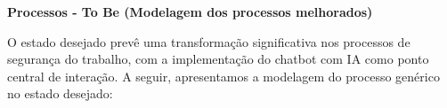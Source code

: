 \documentclass[12pt,a4paper]{article}
\begin{document}
\begin{table}[htbp]
\centering
\begin{minipage}{0.8\textwidth}
\centering
{}
\caption{Arquitetura tecnológica atual}
\end{minipage}
\end{table}

\begin{table}[htbp]
\centering
\begin{minipage}{0.8\textwidth}
\centering
{}
\caption{Arquitetura tecnológica nova}
\end{minipage}
\end{table}

\begin{center}
\textbf{Processos - To Be (Modelagem dos processos melhorados)}
\end{center}

O estado desejado prevê uma transformação significativa nos processos de segurança do trabalho, com a implementação do chatbot com IA como ponto central de interação. A seguir, apresentamos a modelagem do processo genérico no estado desejado:
\end{document}
